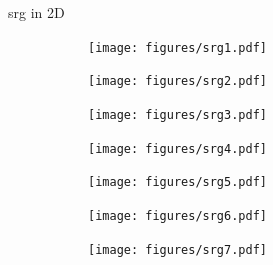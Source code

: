 \documentclass{beamer}
\begin{document}
\begin{frame}{\Ac{srg} in 2D}
\centering
\begin{tcolorbox}[boxsep=1pt,left=0pt,right=0pt,top=0pt,bottom=0pt,title=round 0]
\begin{figure}[h]
\begin{subfigure}[b]{0.15\linewidth}%
\centering
  \texttt{[image: figures/srg1.pdf]}
\end{subfigure}%
\end{figure}
\end{tcolorbox}
\begin{tcolorbox}[boxsep=1pt,left=0pt,right=0pt,top=0pt,bottom=0pt,title=round 1]
\begin{figure}[h]
\begin{subfigure}[b]{0.15\linewidth}%
\centering
  \texttt{[image: figures/srg2.pdf]}
\end{subfigure}%
\begin{subfigure}[b]{0.15\linewidth}%
\centering
  \texttt{[image: figures/srg3.pdf]}
\end{subfigure}%
\begin{subfigure}[b]{0.15\linewidth}%
\centering
  \texttt{[image: figures/srg4.pdf]}
\end{subfigure}%
\begin{subfigure}[b]{0.15\linewidth}%
\centering
  \texttt{[image: figures/srg5.pdf]}
\end{subfigure}%
\end{figure}
\end{tcolorbox}
\begin{tcolorbox}[boxsep=1pt,left=0pt,right=0pt,top=0pt,bottom=0pt,title=round 2]
\begin{figure}[h]
\begin{subfigure}[b]{0.15\linewidth}%
\centering
  \texttt{[image: figures/srg6.pdf]}
\end{subfigure}%
\begin{subfigure}[b]{0.15\linewidth}%
\centering
  \texttt{[image: figures/srg7.pdf]}
\end{subfigure}%
\begin{subfigure}[b]{0.15\linewidth}%

\end{subfigure}
\end{figure}
\end{tcolorbox}
\end{frame}
\end{document}
